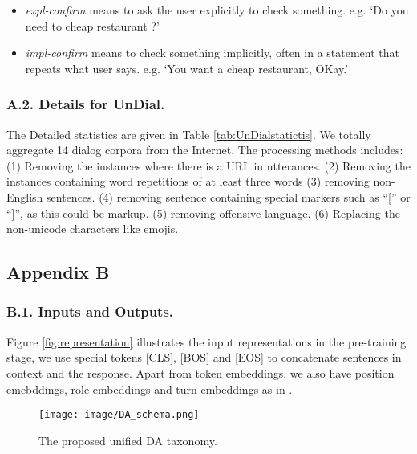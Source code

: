 \documentclass[letterpaper]{article} \usepackage{aaai22}  \usepackage{times}  \usepackage{helvet}  \usepackage{courier}  \usepackage[hyphens]{url}  \usepackage{graphicx} \urlstyle{rm} \def\UrlFont{\rm}  \usepackage{natbib}  \usepackage{caption} \DeclareCaptionStyle{ruled}{labelfont=normalfont,labelsep=colon,strut=off} \frenchspacing  \setlength{\pdfpagewidth}{8.5in}  \setlength{\pdfpageheight}{11in}  \usepackage{algorithm}
\begin{document}
\begin{itemize}
    \item \textit{expl-confirm} means to ask the user explicitly to check something. e.g. `Do you need to cheap restaurant ?'
    \item \textit{impl-confirm} means to check something implicitly, often in a statement that repeats what user says. e.g. `You want a cheap restaurant, OKay.'
\end{itemize}

\subsubsection{A.2. Details for UnDial.}
\label{AppxA_2}
The Detailed statistics are given in Table \ref{tab:UnDialstatictis}.  We totally aggregate 14 dialog corpora from the Internet. 
The processing methods includes: 
(1) Removing the instances
where  there is a URL in utterances.
(2) Removing the instances containing word repetitions of at
least three words
(3) removing non-English sentences.
(4) removing sentence containing special
markers such as “[” or “]”, as this could be markup.
(5) removing offensive language. 
(6) Replacing the non-unicode characters like emojis.












\subsection*{Appendix B}
\label{AppxB}
\subsubsection{B.1. Inputs and Outputs.}
\label{AppxB_1}
Figure \ref{fig:representation} illustrates the input representations in the pre-training stage, we use special tokens [CLS], [BOS] and [EOS] to concatenate sentences in context and the response. Apart from token embeddings, we also have  position emebddings, role embeddings and turn embeddings as in \citet{bao2020plato}.

\begin{figure*}[t]
    \centering
    \texttt{[image: image/DA\_schema.png]}
    \caption{The proposed unified DA taxonomy.}
    \label{fig:DA_schema}
\end{figure*}
\end{document}
